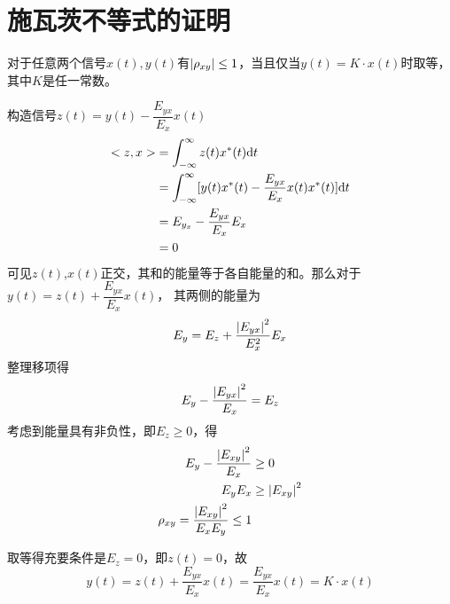 \section{施瓦茨不等式的证明}\label{appendix:III}
对于任意两个信号$x(t),y(t)$有$\left\vert \rho_{xy} \right\vert\leq 1$，当且仅当$y(t)=K\cdot x(t)$时取等，其中$K$是任一常数。

\noindent\Proof

构造信号$z(t)=y(t)-\dfrac{E_{yx}}{E_x}x(t)$
\begin{equation*}
    \begin{split}
        <z,x>&=\int_{-\infty}^{\infty}z(t)x^*(t)\text{\upshape d} t\\
             &=\int_{-\infty}^{\infty}[y(t)x^*(t)-\frac{E_{yx}}{E_x}x(t)x^*(t)]\text{\upshape d} t\\
             &=E_{y_x}-\frac{E_{yx}}{E_x}E_x\\
             &=0
    \end{split}
\end{equation*}
可见$z(t)$,$x(t)$正交，其和的能量等于各自能量的和。那么对于$y(t)=z(t)+\dfrac{E_{yx}}{E_x}x(t)$，
其两侧的能量为
\begin{equation*}
    E_y=E_z+\frac{\left\vert E_{yx} \right\vert^2}{E_x^2}E_x
\end{equation*}
整理移项得
\begin{equation*}
    E_y-\frac{\left\vert E_{yx} \right\vert^2}{E_x}=E_z
\end{equation*}
考虑到能量具有非负性，即$E_z\geq 0$，得
\begin{equation*}
    \begin{split}
        E_y-\frac{\left\vert E_{xy} \right\vert^2}{E_x}&\geq 0\\
        E_yE_x&\geq \left\vert E_{xy} \right\vert^2\\
        \rho_{xy}=\frac{\left\vert E_{xy} \right\vert^2}{E_xE_y}\leq 1
    \end{split}
\end{equation*}

取等得充要条件是$E_z= 0$，即$z(t)=0$，故
\begin{equation*}
    y(t)=z(t)+\frac{E_{yx}}{E_x}x(t)=\frac{E_{yx}}{E_x}x(t)=K\cdot x(t)
\end{equation*}

\hfill{}
